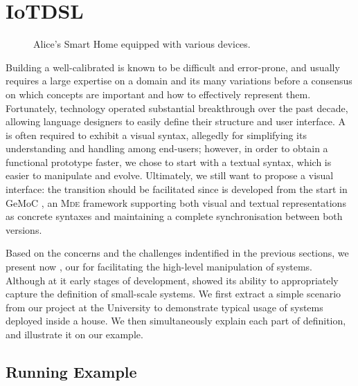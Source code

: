 \section{IoTDSL}
\label{sec:IoTDSL}

\begin{figure*}%
\caption{Alice's Smart Home equipped with various devices.}%
\label{fig:RE}%
\end{figure*}

Building a well-calibrated \DSL is known to be difficult and error-prone, and usually requires a large expertise on a domain and its many variations before a consensus on which concepts are important and how to effectively represent them. Fortunately, \MDE technology operated substantial breakthrough over the past decade, allowing language designers to easily define their \DSL structure and user interface. A \DSL is often required to exhibit a visual syntax, allegedly for simplifying its understanding and handling among end-users; however, in order to obtain a functional prototype faster, we chose to start with a textual syntax, which is easier to manipulate and evolve. Ultimately, we still want to propose a visual interface: the transition should be facilitated since \IOTDSL is developed from the start in GeMoC \cite{}, an \textsc{Mde} framework supporting both visual and textual representations as concrete syntaxes and maintaining a complete synchronisation between both versions.

Based on the concerns and the challenges indentified in the previous sections, we present now \IOTDSL, our \DSL for facilitating the high-level manipulation of \IOT systems. Although at it early stages of development, \IOTDSL showed its ability to appropriately capture the definition of small-scale \IOT systems. We first extract a simple scenario from our project at the University to demonstrate typical usage of \IOT systems deployed inside a house. We then simultaneously explain each part of \IOTDSL definition, and illustrate it on our example.

\subsection{Running Example}
\label{sec:IoTDSL-Example}


